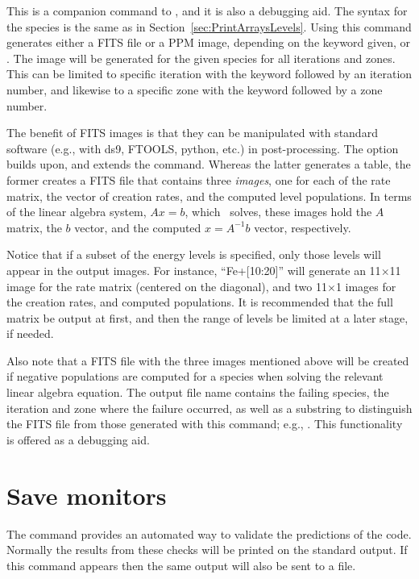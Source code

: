 This is a companion command to , and it is also a
debugging aid.
The syntax for the species is the same as in Section~\ref{sec:PrintArraysLevels}.
Using this command generates either a FITS file or a PPM image, depending on the
keyword given,  or .
The image will be generated for the given species for all iterations and zones.
This can be limited to specific iteration with the keyword
 followed by an iteration number, and likewise to
a specific zone with the keyword  followed by a zone number.

The benefit of FITS images is that they can be manipulated with standard
software (e.g., with ds9, FTOOLS, python, etc.) in post-processing.
The  option builds upon, and extends the 
command.
Whereas the latter generates a table, the former creates a FITS file that
contains three {\it images}, one for each of the rate matrix, the vector of
creation rates, and the computed level populations.
In terms of the linear algebra system, $A x = b$, which \Cloudy\ solves, these
images hold the $A$ matrix, the $b$ vector, and the computed $x = A^{-1} b$
vector, respectively.

Notice that if a subset of the energy levels is specified, only those levels
will appear in the output images.
For instance, ``Fe+[10:20]'' will generate an 11$\times$11 image for the rate
matrix (centered on the diagonal), and two 11$\times$1 images for the creation
rates, and computed populations.
It is recommended that the full matrix be output at first, and then the range of
levels be limited at a later stage, if needed.

Also note that a FITS file with the three images mentioned above will be created
if negative populations are computed for a species when solving the relevant
linear algebra equation.
The output file name contains the failing species, the iteration and zone where
the failure occurred, as well as a substring to distinguish the FITS file from
those generated with this command; e.g.,
.
This functionality is offered as a debugging aid.

\section{Save monitors}
\label{sec:SaveMonitorsCommand}

The  command provides
an automated way to validate the predictions of the code.
Normally the
results from these checks will be printed on the standard output.
If this
command appears then the same output will also be sent to a file.

